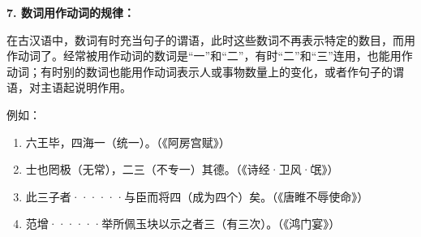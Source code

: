 \textbf{7. 数词用作动词的规律：}

在古汉语中，数词有时充当句子的谓语，此时这些数词不再表示特定的数目，而用作动词了。经常被用作动词的数词是“一”和“二”，有时“二”和“三”连用，也能用作动词；有时别的数词也能用作动词表示人或事物数量上的变化，或者作句子的谓语，对主语起说明作用。

例如：
\newpage

\begin{enumerate}[label=\textcircled{\arabic*}]
	\item 六王毕，四海一（统一）。（《阿房宫赋》）
	\item 士也罔极（无常），二三（不专一）其德。（《诗经·卫风·氓》）
	\item 此三子者······与臣而将四（成为四个）矣。（《唐睢不辱使命》）
	\item 范增······举所佩玉块以示之者三（有三次）。（《鸿门宴》）
\end{enumerate}
\newpage